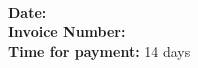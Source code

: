 \documentclass[onecolumn]{article} %
\begin{document}
\vspace{2cm}


\begin{multicols}{3}
\begin{flushleft}
\invoiceename\\
\invoiceefullname\\
\invoiceestreet\\
\invoiceezipcode~\invoiceecity\\
\invoiceecountry\\
\end{flushleft}


\columnbreak
\begin{flushleft}
\vfill
\end{flushleft}
\vspace{2cm}

\columnbreak
\begin{flushleft}
\vspace*{1cm}
\myfullname\\
\mystreet\\
\myzipcode~\mycity\\
\myphone\\

\ifx\mywebsite\undefined
\else
\href{\mywebsite}{\mywebsite}\\
\fi
\href{\myemail}{\myemail}\\
\end{flushleft}

\end{multicols}

\begin{flushright}
\textbf{Date:}~\invoicedate\\
\textbf{Invoice Number:}~\invoicenumber\\
\textbf{Time for payment:} 14 days\\
\end{flushright}
\end{document}
